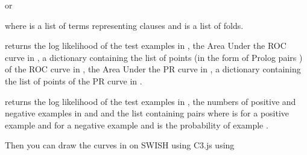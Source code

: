 \documentclass[letterpaper,10pt,english]{sphinxmanual}
\begin{document}
\sphinxAtStartPar
or

\begin{sphinxVerbatim}[commandchars=\\\{\}]
  
\end{sphinxVerbatim}

\sphinxAtStartPar
where  is a list of terms representing clauses and  is a list of folds.

\sphinxAtStartPar
{} returns the log likelihood of the test examples in , the Area Under the ROC curve in , a dictionary containing the list of points (in the form of Prolog pairs ) of the ROC curve in , the Area Under the PR curve in , a dictionary containing the list of points of the PR curve in .

\sphinxAtStartPar
{} returns the log likelihood of the test examples in , the numbers of positive and negative examples in  and  and the list  containing pairs  where  is  for  a positive example and  for  a negative example and  is the probability of example .

\sphinxAtStartPar
Then you can draw the curves in  on SWISH using C3.js using

\begin{sphinxVerbatim}[commandchars=\\\{\}]
  
\end{sphinxVerbatim}
\end{document}
